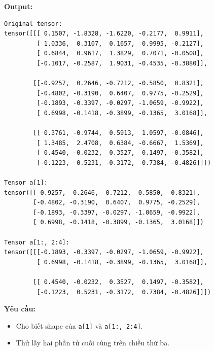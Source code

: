 \documentclass[12pt,a4paper]{article}
\begin{document}
\textbf{Output:}
\begin{verbatim}
Original tensor:
tensor([[[ 0.1507, -1.8328, -1.6220, -0.2177,  0.9911],
         [ 1.0336,  0.3107,  0.1657,  0.9995, -0.2127],
         [ 0.6844,  0.9617,  1.3829,  0.7071, -0.0508],
         [-0.1017, -0.2587,  1.9031, -0.4535, -0.3880]],

        [[-0.9257,  0.2646, -0.7212, -0.5850,  0.8321],
         [-0.4802, -0.3190,  0.6407,  0.9775, -0.2529],
         [-0.1893, -0.3397, -0.0297, -1.0659, -0.9922],
         [ 0.6998, -0.1418, -0.3899, -0.1365,  3.0168]],

        [[ 0.3761, -0.9744,  0.5913,  1.0597, -0.0846],
         [ 1.3485,  2.4708,  0.6384, -0.6667,  1.5369],
         [ 0.4540, -0.0232,  0.3527,  0.1497, -0.3582],
         [-0.1223,  0.5231, -0.3172,  0.7384, -0.4826]]])

Tensor a[1]:
tensor([[-0.9257,  0.2646, -0.7212, -0.5850,  0.8321],
        [-0.4802, -0.3190,  0.6407,  0.9775, -0.2529],
        [-0.1893, -0.3397, -0.0297, -1.0659, -0.9922],
        [ 0.6998, -0.1418, -0.3899, -0.1365,  3.0168]])

Tensor a[1:, 2:4]:
tensor([[[-0.1893, -0.3397, -0.0297, -1.0659, -0.9922],
         [ 0.6998, -0.1418, -0.3899, -0.1365,  3.0168]],

        [[ 0.4540, -0.0232,  0.3527,  0.1497, -0.3582],
         [-0.1223,  0.5231, -0.3172,  0.7384, -0.4826]]])
\end{verbatim}

\textbf{Yêu cầu:}
\begin{itemize}
    \item Cho biết shape của \texttt{a[1]} và \texttt{a[1:, 2:4]}.
    \item Thử lấy hai phần tử cuối cùng trên chiều thứ ba.
\end{itemize}
\end{document}
